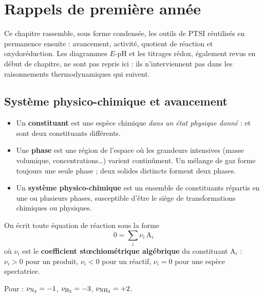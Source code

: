 \chapter{Rappels de première année}

Ce chapitre rassemble, sous forme condensée, les outils de PTSI réutilisés en permanence ensuite : avancement, activité, quotient de réaction et oxydoréduction. Les diagrammes $E$-pH et les titrages rédox, également revus en début de chapitre, ne sont pas repris ici : ils n'interviennent pas dans les raisonnements thermodynamiques qui suivent.

\section{Système physico-chimique et avancement}

\begin{definition}
\begin{itemize}
  \item Un \textbf{constituant} est une espèce chimique \emph{dans un état physique donné} :  et  sont deux constituants différents.
  \item Une \textbf{phase} est une région de l'espace où les grandeurs intensives (masse volumique, concentrations\dots) varient continûment. Un mélange de gaz forme toujours une seule phase ; deux solides distincts forment deux phases.
  \item Un \textbf{système physico-chimique} est un ensemble de constituants répartis en une ou plusieurs phases, susceptible d'être le siège de transformations chimiques ou physiques.
\end{itemize}
\end{definition}

\begin{definition}
On écrit toute équation de réaction sous la forme
\[ 0 = \sum_i \nu_i\,\mathrm{A}_i \]
où $\nu_i$ est le \textbf{coefficient stœchiométrique algébrique} du constituant $\mathrm{A}_i$ : $\nu_i>0$ pour un produit, $\nu_i<0$ pour un réactif, $\nu_i = 0$ pour une espèce spectatrice.
\end{definition}

\begin{exemple}
Pour  : $\nu_{\ce{N2}} = -1$, $\nu_{\ce{H2}} = -3$, $\nu_{\ce{NH3}} = +2$.
\end{exemple}

